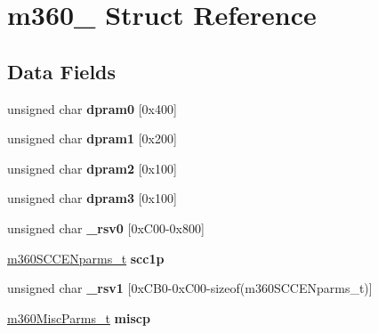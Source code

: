 \hypertarget{structm360__}{}\section{m360\+\_\+ Struct Reference}
\label{structm360__}
\subsection*{Data Fields}
\begin{DoxyCompactItemize}
\item 
\mbox{\label{structm360___a0c78f73f91e46fc624a321bfc5f55c03}} 
unsigned char {\bfseries dpram0} \mbox{[}0x400\mbox{]}
\item 
\mbox{\label{structm360___afa3f30b02826ce597054c6e03670bf08}} 
unsigned char {\bfseries dpram1} \mbox{[}0x200\mbox{]}
\item 
\mbox{\label{structm360___a4d9cf7be797d8fd19fd87d9bbc937acd}} 
unsigned char {\bfseries dpram2} \mbox{[}0x100\mbox{]}
\item 
\mbox{\label{structm360___a4dc9e056eb9fb501762ac95d773ec2c9}} 
unsigned char {\bfseries dpram3} \mbox{[}0x100\mbox{]}
\item 
\mbox{\label{structm360___af3357fad271c483b413640b87267b2a8}} 
unsigned char {\bfseries \+\_\+rsv0} \mbox{[}0x\+C00-\/0x800\mbox{]}
\item 
\mbox{\label{structm360___a7d599a6acc38a9abf5e332e6a157cedb}} 
\mbox{\hyperlink{structm360SCCENparms__}{m360\+S\+C\+C\+E\+Nparms\+\_\+t}} {\bfseries scc1p}
\item 
\mbox{\label{structm360___ab27647791acde8ad5ab38ee658ddcd9f}} 
unsigned char {\bfseries \+\_\+rsv1} \mbox{[}0x\+C\+B0-\/0x\+C00-\/sizeof(m360\+S\+C\+C\+E\+Nparms\+\_\+t)\mbox{]}
\item 
\mbox{\label{structm360___a739fa0d9c31c0b3d3537ec62f8638c83}} 
\mbox{\hyperlink{structm360MiscParms__}{m360\+Misc\+Parms\+\_\+t}} {\bfseries miscp}
\item 
\mbox{\label{structm360___a82384cac835a19dc871f926bb1639862}} 

\end{DoxyCompactItemize}
